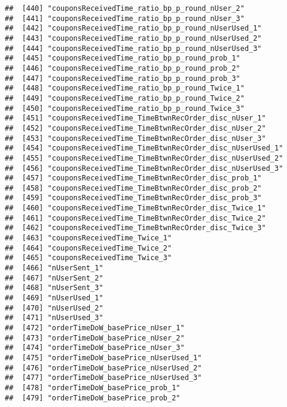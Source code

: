 \documentclass[10pt]{report}
\begin{document}
\begin{verbatim}
##  [440] "couponsReceivedTime_ratio_bp_p_round_nUser_2"         
##  [441] "couponsReceivedTime_ratio_bp_p_round_nUser_3"         
##  [442] "couponsReceivedTime_ratio_bp_p_round_nUserUsed_1"     
##  [443] "couponsReceivedTime_ratio_bp_p_round_nUserUsed_2"     
##  [444] "couponsReceivedTime_ratio_bp_p_round_nUserUsed_3"     
##  [445] "couponsReceivedTime_ratio_bp_p_round_prob_1"          
##  [446] "couponsReceivedTime_ratio_bp_p_round_prob_2"          
##  [447] "couponsReceivedTime_ratio_bp_p_round_prob_3"          
##  [448] "couponsReceivedTime_ratio_bp_p_round_Twice_1"         
##  [449] "couponsReceivedTime_ratio_bp_p_round_Twice_2"         
##  [450] "couponsReceivedTime_ratio_bp_p_round_Twice_3"         
##  [451] "couponsReceivedTime_TimeBtwnRecOrder_disc_nUser_1"    
##  [452] "couponsReceivedTime_TimeBtwnRecOrder_disc_nUser_2"    
##  [453] "couponsReceivedTime_TimeBtwnRecOrder_disc_nUser_3"    
##  [454] "couponsReceivedTime_TimeBtwnRecOrder_disc_nUserUsed_1"
##  [455] "couponsReceivedTime_TimeBtwnRecOrder_disc_nUserUsed_2"
##  [456] "couponsReceivedTime_TimeBtwnRecOrder_disc_nUserUsed_3"
##  [457] "couponsReceivedTime_TimeBtwnRecOrder_disc_prob_1"     
##  [458] "couponsReceivedTime_TimeBtwnRecOrder_disc_prob_2"     
##  [459] "couponsReceivedTime_TimeBtwnRecOrder_disc_prob_3"     
##  [460] "couponsReceivedTime_TimeBtwnRecOrder_disc_Twice_1"    
##  [461] "couponsReceivedTime_TimeBtwnRecOrder_disc_Twice_2"    
##  [462] "couponsReceivedTime_TimeBtwnRecOrder_disc_Twice_3"    
##  [463] "couponsReceivedTime_Twice_1"                          
##  [464] "couponsReceivedTime_Twice_2"                          
##  [465] "couponsReceivedTime_Twice_3"                          
##  [466] "nUserSent_1"                                          
##  [467] "nUserSent_2"                                          
##  [468] "nUserSent_3"                                          
##  [469] "nUserUsed_1"                                          
##  [470] "nUserUsed_2"                                          
##  [471] "nUserUsed_3"                                          
##  [472] "orderTimeDoW_basePrice_nUser_1"                       
##  [473] "orderTimeDoW_basePrice_nUser_2"                       
##  [474] "orderTimeDoW_basePrice_nUser_3"                       
##  [475] "orderTimeDoW_basePrice_nUserUsed_1"                   
##  [476] "orderTimeDoW_basePrice_nUserUsed_2"                   
##  [477] "orderTimeDoW_basePrice_nUserUsed_3"                   
##  [478] "orderTimeDoW_basePrice_prob_1"                        
##  [479] "orderTimeDoW_basePrice_prob_2"                        

\end{verbatim}
\end{document}
